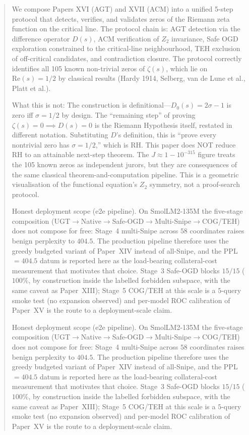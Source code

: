 \documentclass[11pt]{article}
\begin{document}
\begin{abstract}
We compose Papers XVI (AGT) and XVII (ACM) into a unified 5-step protocol
that detects, verifies, and validates zeros of the Riemann zeta function
on the critical line. The protocol chain is: AGT detection via the
difference operator $D(s)$, ACM verification of $Z_2$ invariance, Safe
OGD exploration constrained to the critical-line neighbourhood, TEH
exclusion of off-critical candidates, and contradiction closure. The
protocol correctly identifies all 105 known non-trivial zeros of $\zeta(s)$,
which lie on $\mathrm{Re}(s)=1/2$ by classical results (Hardy 1914, Selberg,
van de Lune et al., Platt et al.).

What this is not: The construction is definitional---$D_0(s)=2\sigma-1$ is zero iff $\sigma=1/2$ by design. The ``remaining step'' of proving $\zeta(s)=0 \implies D(s)=0$ is the Riemann Hypothesis itself, restated in different notation. Substituting $D$'s definition, this is ``prove every nontrivial zero has $\sigma=1/2$,'' which is RH. This paper does NOT reduce RH to an attainable next-step theorem. The $J\approx 1-10^{-315}$ figure treats the 105 known zeros as independent jurors, but they are consequences of the same classical theorem-and-computation pipeline. This is a geometric visualisation of the functional equation's $Z_2$ symmetry, not a proof-search protocol.

Honest deployment scope (e2e pipeline). On SmolLM2-135M the five-stage composition (UGT$\to$Native$\to$Safe-OGD$\to$Multi-Snipe$\to$COG/TEH) does not compose for free: Stage~4 multi-Snipe across $58$ coordinates raises benign perplexity to $404.5$. The production pipeline therefore uses the greedy budgeted variant of Paper~XIV instead of all-Snipe, and the PPL$=404.5$ datum is reported here as the load-bearing collateral-cost measurement that motivates that choice. Stage~3 Safe-OGD blocks $15/15$ ($100\%$, by construction inside the labelled forbidden subspace, with the same caveat as Paper~XIII); Stage~5 COG/TEH at this scale is a $5$-query smoke test (no expansion observed) and per-model ROC calibration of Paper~XV is the route to a deployment-scale claim.

Honest deployment scope (e2e pipeline). On SmolLM2-135M the five-stage composition (UGT$\to$Native$\to$Safe-OGD$\to$Multi-Snipe$\to$COG/TEH) does not compose for free: Stage~4 multi-Snipe across $58$ coordinates raises benign perplexity to $404.5$. The production pipeline therefore uses the greedy budgeted variant of Paper~XIV instead of all-Snipe, and the PPL$=404.5$ datum is reported here as the load-bearing collateral-cost measurement that motivates that choice. Stage~3 Safe-OGD blocks $15/15$ ($100\%$, by construction inside the labelled forbidden subspace, with the same caveat as Paper~XIII); Stage~5 COG/TEH at this scale is a $5$-query smoke test (no expansion observed) and per-model ROC calibration of Paper~XV is the route to a deployment-scale claim.
\end{abstract}
\end{document}
